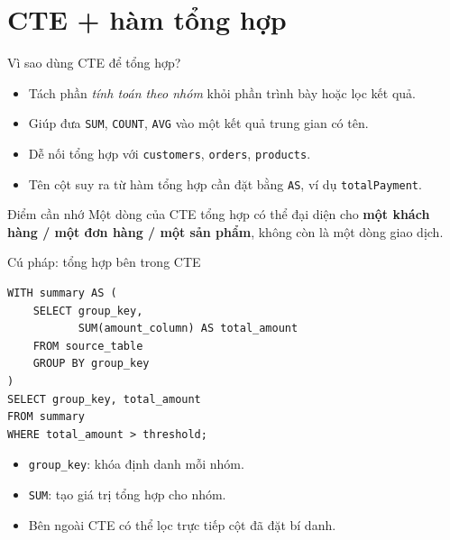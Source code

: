 \documentclass[aspectratio=169,10pt]{beamer}
\newcommand{\code}[1]{\texttt{#1}}
\begin{document}
\section{CTE + hàm tổng hợp}

\begin{frame}[fragile]{Vì sao dùng CTE để tổng hợp?}
\small
\begin{itemize}
\item Tách phần \emph{tính toán theo nhóm} khỏi phần trình bày hoặc lọc kết quả.
\item Giúp đưa \code{SUM}, \code{COUNT}, \code{AVG} vào một kết quả trung gian có tên.
\item Dễ nối tổng hợp với \code{customers}, \code{orders}, \code{products}.
\item Tên cột suy ra từ hàm tổng hợp cần đặt bằng \code{AS}, ví dụ \code{totalPayment}.
\end{itemize}
\vspace{.3em}\begin{block}{Điểm cần nhớ}
Một dòng của CTE tổng hợp có thể đại diện cho \textbf{một khách hàng / một đơn hàng / một sản phẩm}, không còn là một dòng giao dịch.
\end{block}
\end{frame}

\begin{frame}[fragile]{Cú pháp: tổng hợp bên trong CTE}
\small
\begin{lstlisting}[basicstyle=\ttfamily\scriptsize]
WITH summary AS (
    SELECT group_key,
           SUM(amount_column) AS total_amount
    FROM source_table
    GROUP BY group_key
)
SELECT group_key, total_amount
FROM summary
WHERE total_amount > threshold;
\end{lstlisting}
\vspace{.1em}
\begin{itemize}
\item \code{group\_key}: khóa định danh mỗi nhóm.
\item \code{SUM}: tạo giá trị tổng hợp cho nhóm.
\item Bên ngoài CTE có thể lọc trực tiếp cột đã đặt bí danh.
\end{itemize}
\end{frame}
\end{document}
